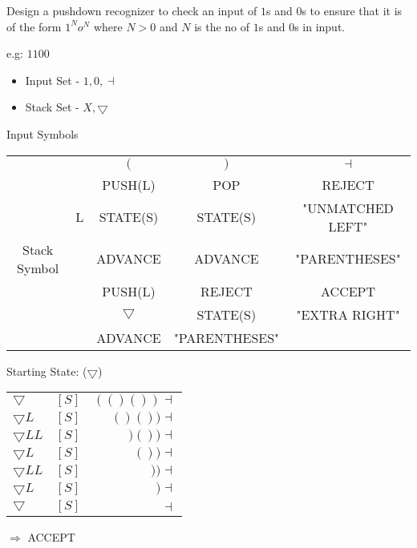 \documentclass[a4paper,12pt]{article}
\begin{document}
Design a pushdown recognizer to check an input of $1$s and $0$s to
ensure that it is of the form $1^{N}o^{N}$ where $N > 0$ and $N$ is the
no of $1$s and $0$s in input.

e.g: $1100$

\begin{itemize}
\item Input Set - ${1, 0, \dashv}$

\item Stack Set - ${X, \bigtriangledown}$
\end{itemize}



Input Symbols

\begin{tabular}{|c|c|c|c|c|}
\hline
					&		&		$($		&		$)$			&		$\dashv$				\\
					&		&	PUSH(L)		&		POP			&		REJECT				\\		
					&	L	&	STATE(S)		&		STATE(S)		&		"UNMATCHED LEFT"	\\
Stack Symbol	&		&	ADVANCE		&		ADVANCE		&		"PARENTHESES" 		\\
\hline
					&		&	PUSH(L)		&		REJECT		&		ACCEPT				\\
				& & $\bigtriangledown$	&	STATE(S)			&		"EXTRA RIGHT"		\\
					&		&	ADVANCE		&	"PARENTHESES"	&								\\
\hline
\end{tabular}

Starting State: ($\bigtriangledown$)

\begin{tabular}{l c r}
$\bigtriangledown$		&	$[S]$	&	$( (  ) (  ) ) \dashv $ \\ 
$\bigtriangledown L$		&	$[S]$	&	$  (  ) (  ) ) \dashv $ \\ 
$\bigtriangledown LL$	&	$[S]$	&	$     ) (  ) ) \dashv $ \\ 
$\bigtriangledown L$		&	$[S]$	&	$		  (  ) ) \dashv $ \\ 
$\bigtriangledown LL$	&	$[S]$	&	$		     ) ) \dashv $ \\ 
$\bigtriangledown L$		&	$[S]$	&	$				 ) \dashv $ \\ 
$\bigtriangledown$		&	$[S]$	&	$ 					\dashv $ \\ 
\end{tabular}

$\Rightarrow$ ACCEPT
\end{document}
